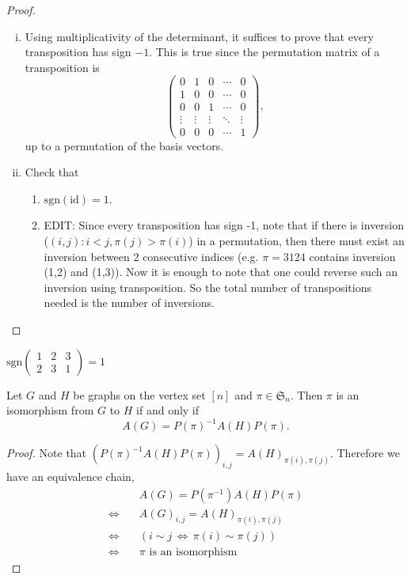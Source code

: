 \begin{proof}
\begin{enumerate}[(i)]
\item Using multiplicativity of the determinant, it suffices to prove that every transposition has sign $-1$. This is true since the permutation matrix of a transposition is
\[
\begin{pmatrix}
0&1&0&\cdots&0\\
1&0&0&\cdots&0\\
0&0&1&\cdots&0\\
\vdots &\vdots&\vdots&\ddots&\vdots\\
0&0&0&\cdots&1
\end{pmatrix}
,\]
up to a permutation of the basis vectors.
\item Check that 
\begin{enumerate}
\item $\mathrm{sgn}(\mathrm{id})=1$.
\item \color{red}EDIT: Since every transposition has sign -1, note that if there is inversion ($(i,j): i < j, \pi(j) > \pi(i)$) in a permutation, then there must exist an inversion between 2 consecutive indices (e.g. $\pi = 3124$ contains inversion (1,2) and (1,3)). Now it is enough to note that one could reverse such an inversion using transposition. So the total number of transpositions needed is the number of inversions.
\end{enumerate}
\end{enumerate}
\end{proof}

\begin{example}
$\mathrm{sgn}\begin{pmatrix}
1&2&3\\
2&3&1
\end{pmatrix}=1$
\end{example}

\begin{proposition}
Let $G$ and $H$ be graphs on the vertex set $[n]$ and $\pi\in\mathfrak{S}_n$. Then $\pi$ is an isomorphism from $G$ to $H$ if and only if 
 \[A(G)=P(\pi)^{-1}A(H)P(\pi).\]
\end{proposition}
\begin{proof}
Note that $(P(\pi)^{-1}A(H)P(\pi))_{i,j}=A(H)_{\pi(i),\pi(j)}.$ Therefore we have an equivalence chain,
\begin{align*}
&A(G)=P(\pi^{-1})A(H)P(\pi)\\
\Longleftrightarrow\quad & A(G)_{i,j}=A(H)_{\pi(i),\pi(j)}\\
\Longleftrightarrow\quad & (i\sim j\,\Longleftrightarrow\,\pi(i)\sim\pi(j))\\
\Longleftrightarrow\quad &\pi \textrm{ is an isomorphism}
\end{align*}
\end{proof}

